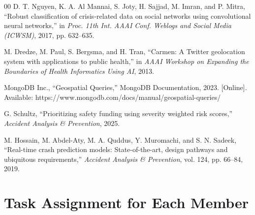 \documentclass[conference]{IEEEtran}
\begin{document}
\begin{thebibliography}{00}
D. T. Nguyen, K. A. Al Mannai, S. Joty, H. Sajjad, M. Imran, and P. Mitra,
``Robust classification of crisis-related data on social networks using
convolutional neural networks,'' in \textit{Proc. 11th Int. AAAI Conf. Weblogs
and Social Media (ICWSM)}, 2017, pp. 632--635.

M. Dredze, M. Paul, S. Bergsma, and H. Tran, ``Carmen: A Twitter geolocation
system with applications to public health,'' in \textit{AAAI Workshop on
Expanding the Boundaries of Health Informatics Using AI}, 2013.

MongoDB Inc., ``Geospatial Queries,'' MongoDB Documentation, 2023. [Online].
Available: https://www.mongodb.com/docs/manual/geospatial-queries/

G. Schultz, ``Prioritizing safety funding using severity weighted risk scores,''
\textit{Accident Analysis \& Prevention}, 2025.

M. Hossain, M. Abdel-Aty, M. A. Quddus, Y. Muromachi, and S. N. Sadeek,
``Real-time crash prediction models: State-of-the-art, design pathways and
ubiquitous requirements,'' \textit{Accident Analysis \& Prevention}, vol. 124,
pp. 66--84, 2019.

\end{thebibliography}

\appendix

\section{Task Assignment for Each Member}
\end{document}
